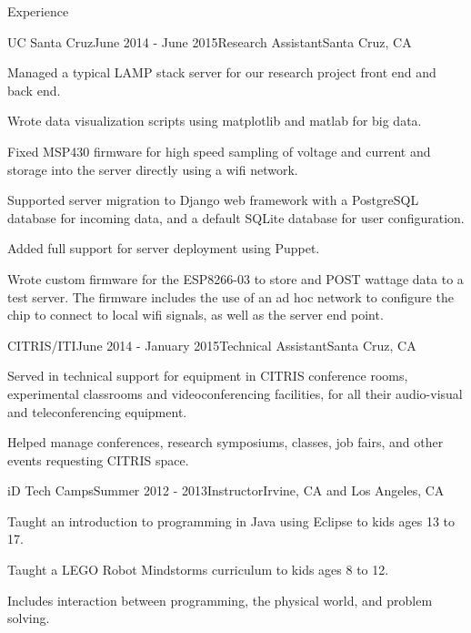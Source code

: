 \documentclass{resume} %
\begin{document}
\begin{rSection}{Experience}

\begin{rSubsection}{UC Santa Cruz}{June 2014 - June 2015}{Research Assistant}{Santa Cruz, CA}
\item Managed a typical LAMP stack server for our research project front end and back end.
\item Wrote data visualization scripts using matplotlib and matlab for big data.
\item Fixed MSP430 firmware for high speed sampling of voltage and current and storage into the server directly using a wifi network.
\item Supported server migration to Django web framework with a PostgreSQL database for incoming data, and a default SQLite database for user configuration.
\item Added full support for server deployment using Puppet.
\item Wrote custom firmware for the ESP8266-03 to store and POST wattage data to a test server. The firmware includes the use of an ad hoc network to configure the chip to connect to local wifi signals, as well as the server end point.
\end{rSubsection}


\begin{rSubsection}{CITRIS/ITI}{June 2014 - January 2015}{Technical Assistant}{Santa Cruz, CA}
\item Served in technical support for equipment in CITRIS conference rooms, experimental classrooms and videoconferencing facilities, for all their audio-visual and teleconferencing equipment.
\item Helped manage conferences, research symposiums, classes, job fairs, and other events requesting CITRIS space.
\end{rSubsection}


\begin{rSubsection}{iD Tech Camps}{Summer 2012 - 2013}{Instructor}{Irvine, CA and Los Angeles, CA}
\item Taught an introduction to programming in Java using Eclipse to kids ages 13 to 17.
\item Taught a LEGO Robot Mindstorms curriculum to kids ages 8 to 12.
\item Includes interaction between programming, the physical world, and problem solving.
\end{rSubsection}

\end{rSection}
\end{document}
